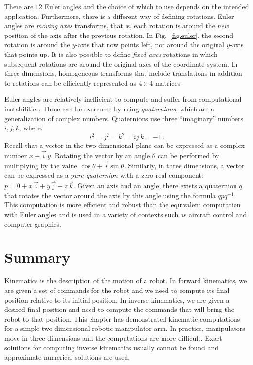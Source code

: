 There are $12$ Euler angles and the choice of which to use depends on the intended application. Furthermore, there is a different way of defining rotations. Euler angles are \emph{moving axes} transforms, that is, each rotation is around the \emph{new} position of the axis after the previous rotation. In Fig.~\ref{fig.euler}, the second rotation is around the $y$-axis that now points left, not around the original $y$-axis that points up. It is also possible to define \emph{fixed axes} rotations in which subsequent rotations are around the original axes of the coordinate system. In three dimensions, homogeneous transforms that include translations in addition to rotations can be efficiently represented as $4\times 4$ matrices.

Euler angles are relatively inefficient to compute and suffer from computational instabilities. These can be overcome by using \emph{quaternions}, which are a generalization of complex numbers. Quaternions use three ``imaginary'' numbers $i,j,k$, where:
\[
i^2 = j^2 = k^2 = ij\,k = -1\,.
\]
Recall that a vector in the two-dimensional plane can be expressed as a complex number $x+\vec{i}\,y$. Rotating the vector by an angle $\theta$ can be performed by multiplying by the value $\cos \theta + \vec{i} \sin \theta$.  Similarly, in three dimensions, a vector can be expressed as a \emph{pure quaternion} with a zero real component: $p=0+x\,\vec{i} + y\,\vec{j} + z\,\vec{k}$. Given an axis and an angle, there exists a quaternion $q$ that rotates the vector around the axis by this angle using the formula $qpq^{-1}$. This computation is more efficient and robust than the equivalent computation with Euler angles and is used in a variety of contexts such as aircraft control and computer graphics.


\section{Summary}

Kinematics is the description of the motion of a robot. In forward kinematics, we are given a set of commands for the robot and we need to compute its final position relative to its initial position. In inverse kinematics, we are given a desired final position and need to compute the commands that will bring the robot to that position. This chapter has demonstrated kinematic computations for a simple two-dimensional robotic manipulator arm. In practice, manipulators move in three-dimensions and the computations are more difficult. Exact solutions for computing inverse kinematics usually cannot be found and approximate numerical solutions are used.

